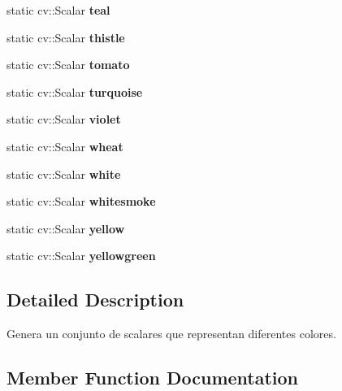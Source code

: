 \begin{DoxyCompactItemize}
static cv\+::\+Scalar {\bfseries teal}
\item 
\mbox{\label{classColor_a918d068eecab159a0b6e3b06f4f9ceec}} 
static cv\+::\+Scalar {\bfseries thistle}
\item 
\mbox{\label{classColor_a4e911f81c2ca3ff575662ccebe65ea7f}} 
static cv\+::\+Scalar {\bfseries tomato}
\item 
\mbox{\label{classColor_a99e39964419380138aefabb3cccc1e48}} 
static cv\+::\+Scalar {\bfseries turquoise}
\item 
\mbox{\label{classColor_ad9ec404fde929af5e6c2a9c5124d0385}} 
static cv\+::\+Scalar {\bfseries violet}
\item 
\mbox{\label{classColor_a9da7a00c41781f1ba29d7526850129b4}} 
static cv\+::\+Scalar {\bfseries wheat}
\item 
\mbox{\label{classColor_a41a642b753dcc90b78b9f3e1c8d0e464}} 
static cv\+::\+Scalar {\bfseries white}
\item 
\mbox{\label{classColor_af4eea4e30f8cbf0236a1f8d500e69eca}} 
static cv\+::\+Scalar {\bfseries whitesmoke}
\item 
\mbox{\label{classColor_a9881d6458a7567616ecc52d669318937}} 
static cv\+::\+Scalar {\bfseries yellow}
\item 
\mbox{\label{classColor_ad68dd4b7603c9e4fd4c60b8b5ad06974}} 
static cv\+::\+Scalar {\bfseries yellowgreen}
\end{DoxyCompactItemize}


\subsection{Detailed Description}
Genera un conjunto de scalares que representan diferentes colores. 

\subsection{Member Function Documentation}
\mbox{\label{classColor_a036f1d514a7bf1e6c36eb4231f18d43e}} 
